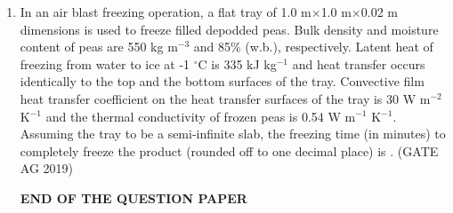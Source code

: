 \documentclass[journal,12pt,onecolumn]{IEEEtran}
\theoremstyle{remark}
\begin{document}
\begin{enumerate}
\item 
In an air blast freezing operation, a flat tray of 1.0 m$\times$1.0 m$\times$0.02 m dimensions is used to freeze filled depodded peas. Bulk density and moisture content of peas are 550 kg m$^{-3}$ and 85\% (w.b.), respectively. Latent heat of freezing from water to ice at -1 $^\circ$C is 335 kJ kg$^{-1}$ and heat transfer occurs identically to the top and the bottom surfaces of the tray. Convective film heat transfer coefficient on the heat transfer surfaces of the tray is 30 W m$^{-2}$ K$^{-1}$ and the thermal conductivity of frozen peas is 0.54 W m$^{-1}$ K$^{-1}$. Assuming the tray to be a semi-infinite slab, the freezing time (in minutes) to completely freeze the product (rounded off to one decimal place) is \underline{\hspace{2cm}}.
\hfill{(GATE AG 2019)}


\begin{center}
\textbf{\large END OF THE QUESTION PAPER}
\end{center}


\end{enumerate}
\end{document}
